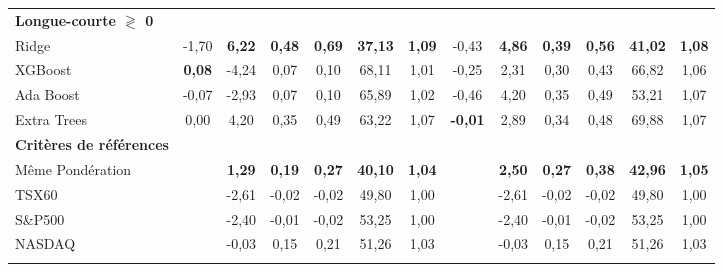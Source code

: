 \documentclass[11pt]{article}
\begin{document}
\begin{table}[h]
{\begin{tabular}{l *{6}{S[table-format=2.2]} | *{6}{S[table-format=2.2]}}
\textbf{Longue-courte $\gtrless$ 0} & & & & & & & & & & & & \\
\addlinespace[0.1cm]
Ridge & -1,70 & \bfseries6,22 & \bfseries0,48 & \bfseries0,69 & \bfseries\color{Green}37,13 & \bfseries1,09 & -0,43 & \bfseries4,86 & \bfseries0,39 & \bfseries0,56 & \bfseries\color{Green}41,02 & \bfseries1,08 \\ \addlinespace[0.1cm]
XGBoost & \bfseries\color{Green}0,08 & -4,24 & 0,07 & 0,10 & 68,11 & 1,01 & -0,25 & 2,31 & 0,30 & 0,43 & 66,82 & 1,06 \\ \addlinespace[0.1cm]
Ada Boost & -0,07 & -2,93 & 0,07 & 0,10 & 65,89 & 1,02 & -0,46 & 4,20 & 0,35 & 0,49 & 53,21 & 1,07 \\ \addlinespace[0.1cm]
Extra Trees & 0,00 & 4,20 & 0,35 & 0,49 & 63,22 & 1,07 & \bfseries\color{Green}-0,01 & 2,89 & 0,34 & 0,48 & 69,88 & 1,07 \\ \addlinespace[0.1cm]
\textbf{Critères de références} & & & & & & & & & & & & \\
\addlinespace[0.1cm]
Même Pondération & & \bfseries1,29 & \bfseries0,19 & \bfseries0,27 & \bfseries40,10 & \bfseries1,04 & & \bfseries2,50 & \bfseries0,27 & \bfseries0,38 & \bfseries42,96 & \bfseries1,05 \\ 
\addlinespace[0.1cm]
TSX60 & & -2,61 & -0,02 & -0,02 & 49,80 & 1,00 & & -2,61 & -0,02 & -0,02 & 49,80 & 1,00 \\ 
\addlinespace[0.1cm]
S\&P500 & & -2,40 & -0,01 & -0,02 & 53,25 & 1,00 & & -2,40 & -0,01 & -0,02 & 53,25 & 1,00 \\ 
\addlinespace[0.1cm]
NASDAQ & & -0,03 & 0,15 & 0,21 & 51,26 & 1,03 & & -0,03 & 0,15 & 0,21 & 51,26 & 1,03 \\ 
\addlinespace[0.1cm]
\bottomrule
\midrule
\end{tabular}}
\end{table}


\newpage
\end{document}

